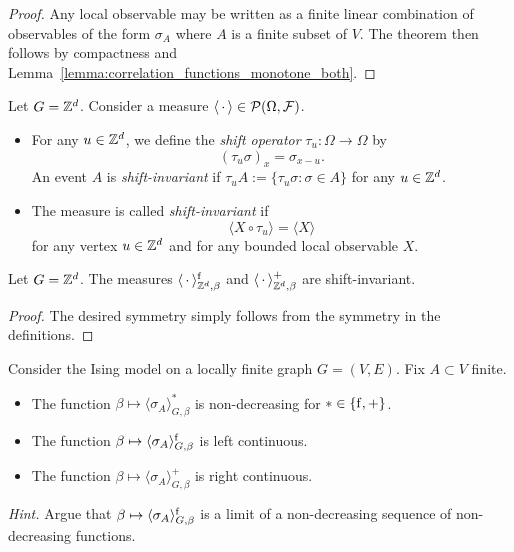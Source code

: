 \begin{proof}
    Any local observable may be written as a finite linear combination
    of observables of the form $\sigma_A$ where $A$ is a finite subset of
    $V$.
    The theorem then follows by compactness and Lemma~\ref{lemma:correlation_functions_monotone_both}.
\end{proof}

\begin{definition}
    Let $G=\mathbb Z^d$.
    Consider a measure $\langle\,\cdot\,\rangle\in\mathcal P(\Omega,\mathcal F)$.
    \begin{itemize}
        \item For any $u\in\mathbb Z^d$, we define the \emph{shift operator} $\tau_u:\Omega\to\Omega$ by
        \[
            (\tau_u\sigma)_x = \sigma_{x-u}.
        \]
        An event $A$ is \emph{shift-invariant} if $\tau_uA:=\{\tau_u\sigma:\sigma\in A\}$ for any $u\in\mathbb Z^d$.
        \item The measure is called \emph{shift-invariant} if
        \[
            \langle X\circ\tau_u \rangle = \langle X\rangle
        \]
        for any vertex $u\in\mathbb Z^d$ and
        for any bounded local observable $X$.
    \end{itemize}
\end{definition}

\begin{theorem}
    Let $G=\mathbb Z^d$.
    The measures $\langle\,\cdot\,\rangle^{\operatorname{f}}_{\mathbb Z^d,\beta}$ and $\langle\,\cdot\,\rangle^+_{\mathbb Z^d,\beta}$
    are shift-invariant.
\end{theorem}

\begin{proof}
    The desired symmetry simply follows from the symmetry in the definitions.
\end{proof}


\begin{exercise}
    Consider the Ising model on a locally finite graph $G=(V,E)$.
    Fix $A\subset V$ finite.
    \begin{itemize}
        \item The function $\beta\mapsto \langle\sigma_A\rangle_{G,\beta}^*$ is non-decreasing for $*\in\{{\operatorname{f}},+\}$.
        \item The function $\beta\mapsto \langle\sigma_A\rangle_{G,\beta}^{\operatorname{f}}$ is left continuous.
        \item The function $\beta\mapsto \langle\sigma_A\rangle_{G,\beta}^+$ is right continuous.
    \end{itemize}
    \emph{Hint.} Argue that $\beta\mapsto \langle\sigma_A\rangle_{G,\beta}^{\operatorname{f}}$
    is a limit of a non-decreasing sequence of non-decreasing functions.
\end{exercise}

